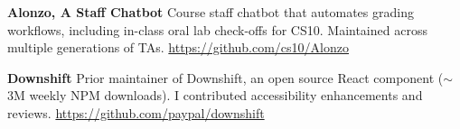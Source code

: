 \vspace{12pt}

\textbf{Alonzo, A Staff Chatbot}
\newline
\small{Course staff chatbot that automates grading workflows, including in-class oral lab check-offs for CS10. Maintained across multiple generations of TAs.}
\newline
\small{\href{https://github.com/cs10/Alonzo}{https://github.com/cs10/Alonzo}}

\vspace{12pt}

\textbf{Downshift}
\newline
\small{Prior maintainer of Downshift, an open source React component ($\sim$3M weekly NPM downloads). I contributed accessibility enhancements and reviews.}
\newline
\small{\href{https://github.com/paypal/downshift}{https://github.com/paypal/downshift}}

\vspace{15pt}

